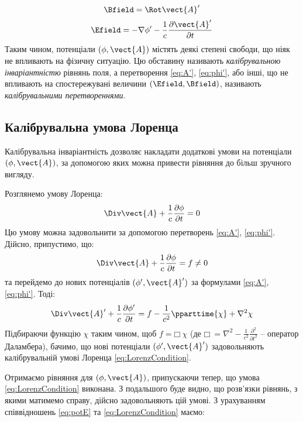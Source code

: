 \begin{equation}
	\Bfield = \Rot \vect{A}'
\end{equation}
\begin{equation}
	\Efield = -\nabla \phi' - \frac{1}{c} \frac{\partial \vect{A}'}{\partial t}
\end{equation}
Таким чином, потенціали $(\phi, \vect{A})$ містять деякі степені свободи, що ніяк не
впливають на фізичну ситуацію. Цю обставину називають \emph{калібрувальною
інваріантністю} рівнянь поля, а перетворення \eqref{eq:A'}, \eqref{eq:phi'}, або інші, що не
впливають на спостережувані величини $(\Efield, \Bfield)$, називають \emph{калібрувальними
перетвореннями}.


\subsection*{Калібрувальна умова Лоренца}

Калібрувальна інваріантність дозволяє накладати додаткові умови на
потенціали $(\phi, \vect{A})$, за допомогою яких можна привести рівняння до більш
зручного вигляду.

Розглянемо умову Лоренца:
\begin{equation}\label{eq:LorenzCondition}
	\Div \vect{A} + \frac{1}{c} \frac{\partial \phi}{\partial t} = 0
\end{equation}
Цю умову можна задовольнити за допомогою перетворень \eqref{eq:A'}, \eqref{eq:phi'}.
Дійсно, припустимо, що:
\begin{equation*}
	\Div \vect{A} + \frac{1}{c} \frac{\partial \phi}{\partial t} = f \neq 0
\end{equation*}
та перейдемо до нових потенціалів $(\phi', \vect{A}')$ за формулами \eqref{eq:A'}, \eqref{eq:phi'}. Тоді:
\begin{equation*}
    \Div \vect{A}' + \frac{1}{c} \frac{\partial \phi'}{\partial t} =
	f - \frac{1}{c^2} \pparttime{\chi} + \nabla^2\chi
\end{equation*}
Підбираючи функцію $\chi$ таким чином, щоб $f = \mdlgwhtsquare\  \chi$
(де $\mdlgwhtsquare\  = \nabla^2 - \frac{1}{c^2} \frac{\partial^2}{\partial t^2}$ – оператор Даламбера), бачимо, що нові потенціали $(\phi',
	\vect{A}')$
задовольняють калібрувальній умові Лоренца \eqref{eq:LorenzCondition}.

Отримаємо рівняння для $(\phi, \vect{A})$, припускаючи тепер, що умова \eqref{eq:LorenzCondition}
виконана. З подальшого буде видно, що розв’язки рівнянь, з якими
матимемо справу, дійсно задовольняють цій умові. З урахуванням
співвідношень \eqref{eq:potE} та \eqref{eq:LorenzCondition} маємо:

